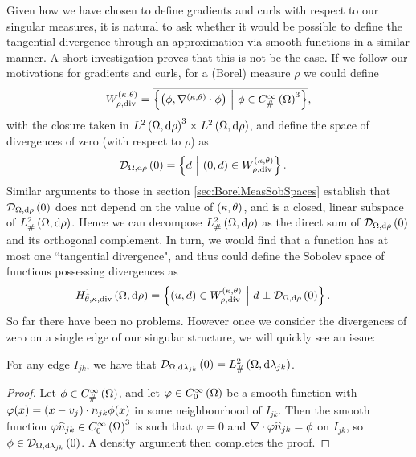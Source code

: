 Given how we have chosen to define gradients and curls with respect to our singular measures, it is natural to ask whether it would be possible to define the tangential divergence through an approximation via smooth functions in a similar manner.
A short investigation proves that this is not be the case.
If we follow our motivations for gradients and curls, for a (Borel) measure $\rho$ we could define
\begin{align*}
	W_{\rho,\mathrm{div}}^{\left( \kappa, \theta \right)} = \overline{\left\{  \left( \phi,\nabla^{\left( \kappa, \theta \right)}\cdot\phi \right) \ \middle\vert \  \phi\in C^{\infty}_{\#}\left( \Omega \right)^3  \right\}},
\end{align*}
with the closure taken in $L^{2}\left( \Omega,\mathrm{d} \rho \right)^3\times L^{2}\left( \Omega,\mathrm{d} \rho \right)$, and define the space of divergences of zero (with respect to $\rho$) as
\begin{align*}
	\mathcal{D}_{\Omega,\mathrm{d}\rho}\left( 0 \right) &= \left\{ d \ \middle\vert \  \left( 0,d \right)\in W_{\rho,\mathrm{div}}^{\left( \kappa, \theta \right)} \right\}.
\end{align*}
Similar arguments to those in section \ref{sec:BorelMeasSobSpaces} establish that $\mathcal{D}_{\Omega,\mathrm{d}\rho}\left( 0 \right)$ does not depend on the value of $\left( \kappa, \theta \right)$, and is a closed, linear subspace of $L^2_{\#}\left( \Omega,\mathrm{d} \rho \right)$.
Hence we can decompose $L^2_{\#}\left( \Omega,\mathrm{d} \rho \right)$ as the direct sum of $\mathcal{D}_{\Omega,\mathrm{d}\rho}\left( 0 \right)$ and its orthogonal complement.
In turn, we would find that a function has at most one ``tangential divergence", and thus could define the Sobolev space of functions possessing divergences as
\begin{align*}
	H^1_{\theta,\kappa,\mathrm{div}}\left( \Omega,\mathrm{d}\rho \right)
	&= \left\{  \left( u,d \right)\in W_{\rho,\mathrm{div}}^{\left( \kappa, \theta \right)} \ \middle\vert \  d\perp\mathcal{D}_{\Omega,\mathrm{d}\rho}\left( 0 \right)  \right\}.
\end{align*}
So far there have been no problems.
However once we consider the divergences of zero on a single edge of our singular structure, we will quickly see an issue:
\begin{lemma} \label{lem:DivZero-Everything}
	For any edge $I_{jk}$, we have that $\mathcal{D}_{\Omega,\mathrm{d}\lambda_{jk}}\left( 0 \right)=L^2_{\#}\left( \Omega,\mathrm{d} \lambda_{jk} \right)$.
\end{lemma}
\begin{proof}
	Let $\phi\in C^{\infty}_{\#}\left( \Omega \right)$, and let $\varphi\in C^{\infty}_{0}\left( \Omega \right)$ be a smooth function with $\varphi(x)=\left( x-v_j \right)\cdot n_{jk}\phi(x)$ in some neighbourhood of $I_{jk}$.
	Then the smooth function $\varphi\widehat{n}_{jk}\in C^{\infty}_{0}\left( \Omega \right)^3$ is such that $\varphi=0$ and $\nabla\cdot\varphi\widehat{n}_{jk}=\phi$ on $I_{jk}$, so $\phi\in\mathcal{D}_{\Omega,\mathrm{d}\lambda_{jk}}\left( 0 \right)$.
	A density argument then completes the proof.
\end{proof}
